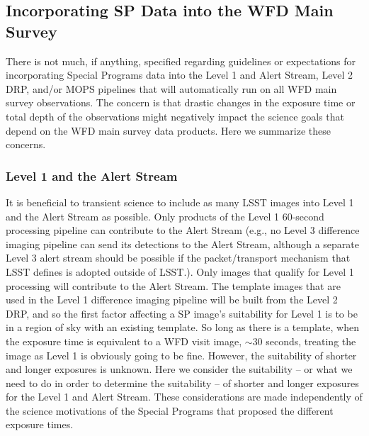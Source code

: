 \documentclass[DM,lsstdraft,toc]{lsstdoc}
\begin{document}
\subsection{Incorporating SP Data into the WFD Main Survey}\label{ssec:dmdocs_SPinWFD}

There is not much, if anything, specified regarding guidelines or expectations for incorporating Special Programs data into the Level 1 and Alert Stream, Level 2 DRP, and/or MOPS pipelines that will automatically run on all WFD main survey observations. The concern is that drastic changes in the exposure time or total depth of the observations might negatively impact the science goals that depend on the WFD main survey data products. Here we summarize these concerns.

\subsubsection{Level 1 and the Alert Stream}\label{ssec:dmdocs_SPinWFD_L1}

It is beneficial to transient science to include as many LSST images into Level 1 and the Alert Stream as possible. Only products of the Level 1 $60$-second processing pipeline can contribute to the Alert Stream (e.g., no Level 3 difference imaging pipeline can send its detections to the Alert Stream, although a separate Level 3 alert stream should be possible if the packet/transport mechanism that LSST defines is adopted outside of LSST.). Only images that qualify for Level 1 processing will contribute to the Alert Stream. The template images that are used in the Level 1 difference imaging pipeline will be built from the Level 2 DRP, and so the first factor affecting a SP image's suitability for Level 1 is to be in a region of sky with an existing template. So long as there is a template, when the exposure time is equivalent to a WFD visit image, $\sim 30$ seconds, treating the image as Level 1 is obviously going to be fine. However, the suitability of shorter and longer exposures is unknown. Here we consider the suitability -- or what we need to do in order to determine the suitability -- of shorter and longer exposures for the Level 1 and Alert Stream. These considerations are made independently of the science motivations of the Special Programs that proposed the different exposure times.

\end{document}
